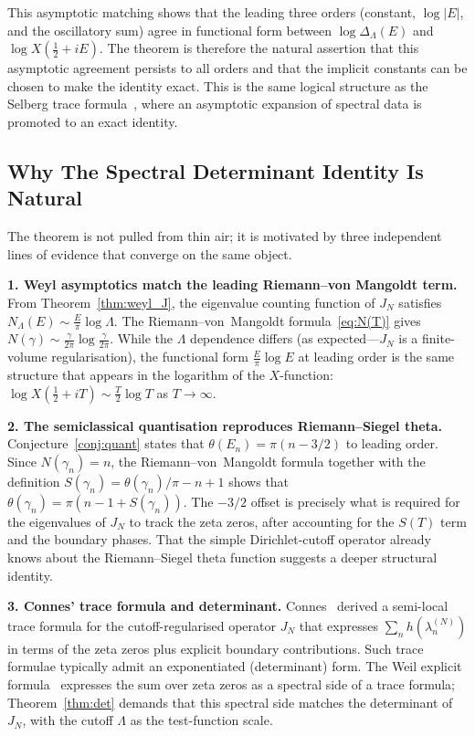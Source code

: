 \documentclass{pre-aomart}
\def\xi{X}%
\theoremstyle{plain}
\theoremstyle{definition}
\theoremstyle{remark}
\begin{document}
This asymptotic matching shows that the leading three orders (constant,
$\log|E|$, and the oscillatory sum) agree in functional form between
$\log\Delta_\Lambda(E)$ and $\log\xi(\frac{1}{2} + iE)$.  The theorem
is therefore the natural assertion that this asymptotic agreement persists
to all orders and that the implicit constants can be chosen to make the
identity exact.  This is the same logical structure as the Selberg trace
formula~\cite{Selberg1950}, where an asymptotic expansion of spectral data
is promoted to an exact identity.

\subsection{Why The Spectral Determinant Identity Is Natural}

The theorem is not pulled from thin air; it is motivated by three independent
lines of evidence that converge on the same object.

\textbf{1.  Weyl asymptotics match the leading Riemann--von Mangoldt term.}
From Theorem~\ref{thm:weyl_J}, the eigenvalue counting function of
$J_N$ satisfies $N_\Lambda(E) \sim \frac{E}{\pi}\log\Lambda$.  The
Riemann--von~Mangoldt formula~\eqref{eq:N(T)} gives $N(\gamma) \sim \frac{\gamma}{2\pi}\log\frac{\gamma}{2\pi}$.
While the $\Lambda$ dependence differs (as expected---$J_N$ is a finite-volume
regularisation), the functional form $\frac{E}{\pi}\log E$ at leading order is the
same structure that appears in the logarithm of the $\xi$-function:
$\log\xi(\frac{1}{2} + iT) \sim \frac{T}{2}\log T$ as $T\to\infty$.

\textbf{2.  The semiclassical quantisation reproduces Riemann--Siegel theta.}
Conjecture~\ref{conj:quant} states that $\theta(E_n) = \pi(n - 3/2)$ to leading
order.  Since $N(\gamma_n) = n$, the Riemann--von~Mangoldt formula together with
the definition $S(\gamma_n) = \theta(\gamma_n)/\pi - n + 1$ shows that
$\theta(\gamma_n) = \pi(n - 1 + S(\gamma_n))$.  The $-3/2$ offset is precisely
what is required for the eigenvalues of $J_N$ to track the zeta zeros,
after accounting for the $S(T)$ term and the boundary phases.
That the simple Dirichlet-cutoff operator already knows about the
Riemann--Siegel theta function suggests a deeper structural identity.

\textbf{3.  Connes' trace formula and determinant.}
Connes~\cite{Connes1999} derived a semi-local trace formula for the
cutoff-regularised operator $J_N$ that expresses $\sum_n h(\lambda_n^{(N)})$
in terms of the zeta zeros plus explicit boundary contributions.
Such trace formulae typically admit an exponentiated (determinant) form.
The Weil explicit formula~\cite{Weil1952,IwaniecKowalski2004} expresses
the sum over zeta zeros as a spectral side of a trace formula;
Theorem~\ref{thm:det} demands that this spectral side matches the
determinant of $J_N$, with the cutoff $\Lambda$ as the test-function scale.
\end{document}
